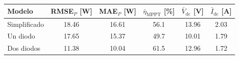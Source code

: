 \begin{tabular}{lccccc}
\toprule
Modelo & RMSE$_P$ [W] & MAE$_P$ [W] & $\bar{\eta}_{\mathrm{MPPT}}$ [\%] & $\bar{V}_{\mathrm{dc}}$ [V] & $\bar{I}_{\mathrm{dc}}$ [A] \\
\midrule
Simplificado & 18.46 & 16.61 & 56.1 & 13.96 & 2.03 \\
Un diodo & 17.65 & 15.37 & 49.7 & 10.01 & 1.79 \\
Dos diodos & 11.38 & 10.04 & 61.5 & 12.96 & 1.72 \\
\bottomrule
\end{tabular}
